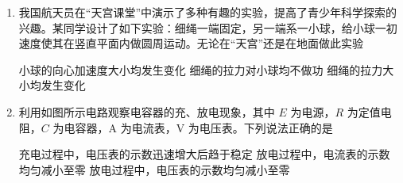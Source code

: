 \documentclass[\gkver]{gaokaozhenti}
\begin{document}
\begin{enumerate}
{B．电子在云室中运行，洛伦兹力不做功，而粒子受到云室内填充物质的阻力作用，粒子速度越来越小，B 错误；

C．带电粒子若仅在洛伦兹力的作用下做匀速圆周运动，根据牛顿第二定律可知 $qvB = m\frac{v^{2}}{r}$，解得粒子运动的半径为 $r = \frac{mv}{qB}$，根据题图可知轨迹 3 对应的粒子运动的半径更大，速度更大，粒子运动过程中受到云室内物质的阻力的情况下，此结论也成立，C 错误。

故选 A。
}

\item
我国航天员在“天宫课堂”中演示了多种有趣的实验，提高了青少年科学探索的兴趣。某同学设计了如下实验：细绳一端固定，另一端系一小球，给小球一初速度使其在竖直平面内做圆周运动。无论在“天宫”还是在地面做此实验


{小球的向心加速度大小均发生变化}
{细绳的拉力对小球均不做功}
{细绳的拉力大小均发生变化}


\item
利用如图所示电路观察电容器的充、放电现象，其中 $E$ 为电源，$R$ 为定值电阻，$C$ 为电容器，A 为电流表，V 为电压表。下列说法正确的是


{充电过程中，电压表的示数迅速增大后趋于稳定}
{放电过程中，电流表的示数均匀减小至零}
{放电过程中，电压表的示数均匀减小至零}


\end{enumerate}
\end{document}
